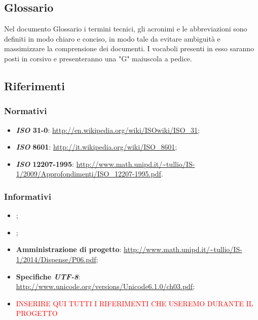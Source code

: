 \subsection{Glossario}
Nel documento Glossario i termini tecnici, gli acronimi e le abbreviazioni sono definiti in modo chiaro e conciso, in modo tale da evitare ambiguità e massimizzare la comprensione dei documenti.
\newline I vocaboli presenti in esso saranno posti in corsivo e presenteranno una "G" maiuscola a pedice.
\subsection{Riferimenti}
\subsubsection{Normativi}
\begin{itemize}
	\item
	\textbf{\textit{ISO} 31-0}: \url{http://en.wikipedia.org/wiki/ISOwiki/ISO\_31};
	\item
	\textbf{\textit{ISO}} \textbf{8601}: \url{http://it.wikipedia.org/wiki/ISO\_8601};
	\item
	\textbf{\textit{ISO}} \textbf{12207-1995}: \url{http://www.math.unipd.it/~tullio/IS-1/2009/Approfondimenti/ISO\_12207-1995.pdf}.
\end{itemize}
\subsubsection{Informativi}
\begin{itemize}
	\item \textit{\PdPv};
	\item \textit{\PdQv};
	\item
	\textbf{Amministrazione di progetto}: \url{http://www.math.unipd.it/~tullio/IS-1/2014/Dispense/P06.pdf};
	\item
	\textbf{Specifiche \textit{UTF-8}}: \url{http://www.unicode.org/versions/Unicode6.1.0/ch03.pdf};
	\item \textcolor{red}{INSERIRE QUI TUTTI I RIFERIMENTI CHE USEREMO DURANTE IL PROGETTO}
\end{itemize}
